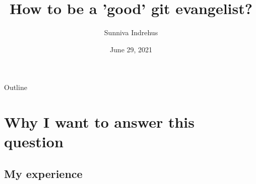 \documentclass[usenames,dvipsnames]{beamer}
\theoremstyle{plain}
\theoremstyle{definition}
\begin{document}
\title{How to be a 'good' git evangelist? }
 \institute{
Nordic-RSE Unconference 
 }

 \author{Sunniva Indrehus }


 \date{\scriptsize June 29, 2021}

 \vspace{-2.cm}
 \frame{
   \titlepage
   \thispagestyle{empty}
 }





\begin{frame}{Outline}
  \tableofcontents[hideallsubsections]
\end{frame}


\section{Why I want to answer this question}
\subsection{My experience}
\end{document}

